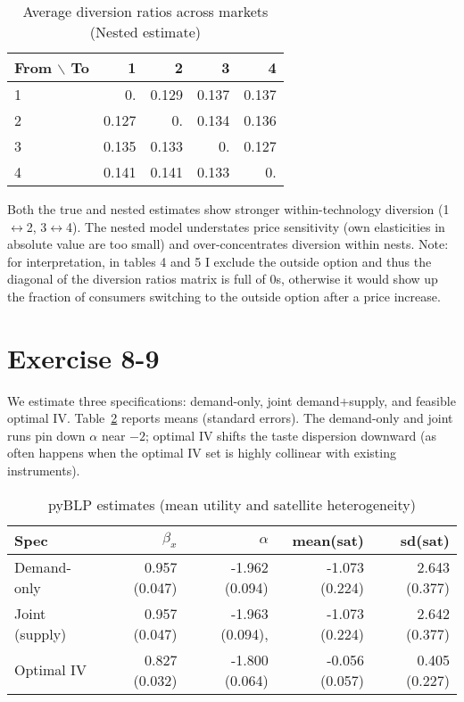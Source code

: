 \documentclass[11pt]{article}
\begin{document}
	\begin{table}[h!]
		\centering
		\caption{Average diversion ratios across markets (Nested estimate)}
		\label{tab:divnest}
		\begin{tabular}{lrrrr}
			\toprule
			From $\backslash$ To & 1 & 2 & 3 & 4 \\
			\midrule
			1 & 0.  &  0.129 & 0.137 & 0.137 \\
			2 & 0.127 & 0.  &  0.134 & 0.136 \\
			3 & 0.135 & 0.133 & 0. &   0.127 \\
			4 & 0.141  & 0.141 & 0.133 & 0.  \\
			\bottomrule
		\end{tabular}
	\end{table}
	
	\noindent
	Both the true and nested estimates show stronger within-technology diversion
	(1$\leftrightarrow$2, 3$\leftrightarrow$4). The nested model understates price sensitivity (own elasticities in absolute
	value are too small) and over-concentrates diversion within nests. Note: for interpretation, in tables 4 and 5 I exclude the outside option and thus the diagonal of the diversion ratios matrix is full of 0s, otherwise it would show up the fraction of consumers switching to the outside option after a price increase.
	
	\section*{Exercise 8-9}
	We estimate three specifications: demand-only, joint demand+supply, and feasible optimal IV.
	Table~\ref{tab:blp} reports means (standard errors). The demand-only and joint runs pin down
	$\alpha$ near $-2$; optimal IV shifts the taste dispersion downward (as often happens when the optimal IV
	set is highly collinear with existing instruments).
	
	\begin{table}[h!]
		\centering
		\caption{pyBLP estimates (mean utility and satellite heterogeneity)}
		\label{tab:blp}
		\begin{tabular}{lrrrr}
			\toprule
			Spec & $\beta_x$ & $\alpha$ & mean(sat) & sd(sat) \\
			\midrule
			 Demand-only  &  0.957 (0.047) &  -1.962 (0.094) & -1.073 (0.224) & 2.643 (0.377) \\
			Joint (supply) & 0.957 (0.047)& -1.963 (0.094), & -1.073 (0.224) &  2.642 (0.377) \\
			Optimal IV       & 0.827 (0.032) & -1.800 (0.064)& -0.056 (0.057) & 0.405 (0.227) \\
			\bottomrule
		\end{tabular}
	\end{table}
	
\end{document}

